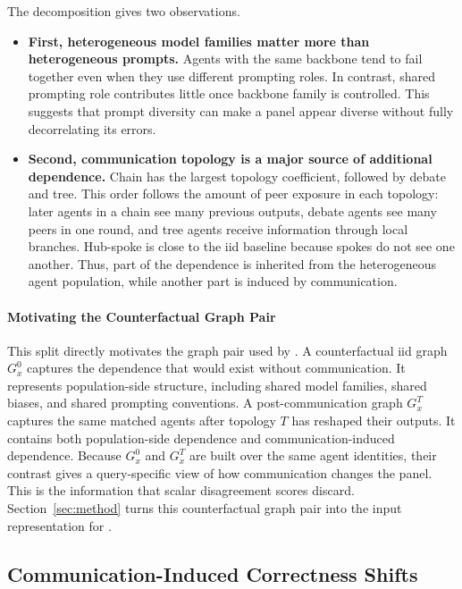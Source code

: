 The decomposition gives two observations. 

\begin{itemize}
\item \textbf{First, heterogeneous model families matter more than heterogeneous prompts.} 
Agents with the same backbone tend to fail together even when they use different prompting roles. 
In contrast, shared prompting role contributes little once backbone family is controlled. 
This suggests that prompt diversity can make a panel appear diverse without fully decorrelating its errors.
\item \textbf{Second, communication topology is a major source of additional dependence.}
Chain has the largest topology coefficient, followed by debate and tree. 
This order follows the amount of peer exposure in each topology: later agents in a chain see many previous outputs, debate agents see many peers in one round, and tree agents receive information through local branches. 
Hub-spoke is close to the iid baseline because spokes do not see one another. 
Thus, part of the dependence is inherited from the heterogeneous agent population, while another part is induced by communication.
\end{itemize}

\paragraph{Motivating the Counterfactual Graph Pair}
This split directly motivates the graph pair used by \methodname{}. 
A counterfactual iid graph $G_x^0$ captures the dependence that would exist without communication. 
It represents population-side structure, including shared model families, shared biases, and shared prompting conventions. 
A post-communication graph $G_x^T$ captures the same matched agents after topology $T$ has reshaped their outputs. 
It contains both population-side dependence and communication-induced dependence.
Because $G_x^0$ and $G_x^T$ are built over the same agent identities, their contrast gives a query-specific view of how communication changes the panel. 
This is the information that scalar disagreement scores discard. 
Section~\ref{sec:method} turns this counterfactual graph pair into the input representation for \methodname{}.

\subsection{Communication-Induced Correctness Shifts}
\label{sec:shifts}

